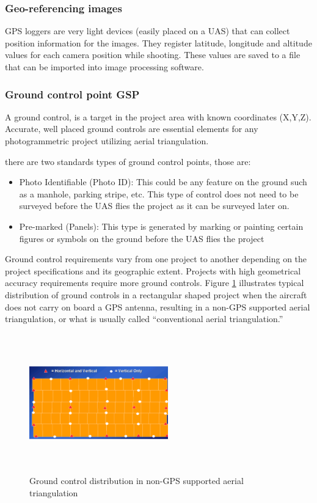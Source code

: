\subsubsection{Geo-referencing images}
GPS loggers are very light devices (easily placed on a UAS) that can collect position information for the images. They register latitude, longitude and altitude values for each camera position while shooting. These values are saved to a file that can be imported into image processing software.\cite{GSDComputation}
\subsubsection{Ground control point GSP}
A ground control, is a target in the project area with known coordinates (X,Y,Z). Accurate, well placed ground controls are essential elements for any photogrammetric project utilizing aerial triangulation.\cite{Design_plann}

there are two standards types of ground control points, those are:
\begin{itemize}
\item Photo Identifiable (Photo ID): This could be any feature on the ground such as a manhole, parking stripe, etc. This type of control does not need to be surveyed before the UAS flies the project as it can be surveyed later on.\cite{Design_plann}
\item Pre-marked (Panels): This type is generated by marking or painting certain figures or symbols on the ground before the UAS flies the project \cite{Design_plann}
\end{itemize}
Ground control requirements vary from one project to another depending on the project specifications and its geographic extent. Projects with high geometrical accuracy requirements require more ground controls. Figure \ref{fig:GCP_sin} illustrates typical distribution of ground controls in a rectangular shaped project when the aircraft does not carry on board a GPS antenna, resulting in a non-GPS supported aerial triangulation, or what is usually called “conventional aerial triangulation.”\cite{GCP}
\begin{figure}[H]
\centering
\includegraphics[width=6cm,height=6cm,keepaspectratio]{imagenes/GCP_sin.PNG}
\caption{ Ground control distribution in non-GPS supported aerial triangulation }
\label{fig:GCP_sin}
\end{figure}
